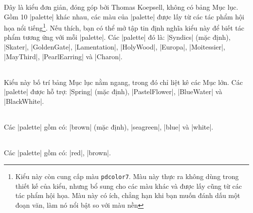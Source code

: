 \begin{description}
Đây là kiểu đơn giản, đóng góp bởi Thomas Koepsell, không có bảng Mục lục.
Gồm 10 |palette| khác nhau, các màu của |palette| được lấy từ các tác phẩm
hội họa nổi tiếng\footnote{%
Kiểu này còn cung cấp màu \texttt{pdcolor7}. Màu này thực ra không dùng trong
thiết kế của kiểu, nhưng bổ sung cho các màu khác và được lấy cũng từ các tác phẩm
hội họa. Màu này có ích, chẳng hạn khi bạn muốn đánh dấu một đoạn văn, làm
nó nổi bật so với màu nền}. Nếu thích, bạn có thể mở tập tin định nghĩa kiểu này
để biết tác phẩm tương ứng với mỗi |palette|. Các |palette| đó là:
|Syndics| (mặc định), |Skater|, |GoldenGate|, |Lamentation|,
|HolyWood|, |Europa|, |Moitessier|, |MayThird|, |PearlEarring| và |Charon|.
\\
\item{}\\
Kiểu này bố trí bảng Mục lục nằm ngang, trong đó chỉ liệt kê các Mục lớn.
Các |palette| được hỗ trợ: |Spring| (mặc định), |PastelFlower|, |BlueWater|
và |BlackWhite|.
\\
\item{}\\
Các |palette| gồm có: |brown| (mặc định), |seagreen|, |blue| và |white|.
\\
\item{}\\
Các |palette| gồm có: |red|, |brown|.
\\
\end{description}
\endinput
